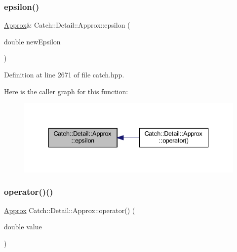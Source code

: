 \subsubsection{\texorpdfstring{epsilon()}{epsilon()}}
{\footnotesize\ttfamily \hyperlink{class_catch_1_1_detail_1_1_approx}{Approx}\& Catch\+::\+Detail\+::\+Approx\+::epsilon (\begin{DoxyParamCaption}\item[{double}]{new\+Epsilon }\end{DoxyParamCaption})\hspace{0.3cm}{\ttfamily [inline]}}



Definition at line 2671 of file catch.\+hpp.

Here is the caller graph for this function\+:\nopagebreak
\begin{figure}[H]
\begin{center}
\leavevmode
\includegraphics[width=336pt]{class_catch_1_1_detail_1_1_approx_a05c50c3ad0a971fab19345b5d94979a9_icgraph}
\end{center}
\end{figure}
\hypertarget{class_catch_1_1_detail_1_1_approx_a48c9cbc28a05dc9dc8c3973b9eae2268}{}\label{class_catch_1_1_detail_1_1_approx_a48c9cbc28a05dc9dc8c3973b9eae2268} 
\subsubsection{\texorpdfstring{operator()()}{operator()()}}
{\footnotesize\ttfamily \hyperlink{class_catch_1_1_detail_1_1_approx}{Approx} Catch\+::\+Detail\+::\+Approx\+::operator() (\begin{DoxyParamCaption}\item[{double}]{value }\end{DoxyParamCaption})\hspace{0.3cm}{\ttfamily [inline]}}



